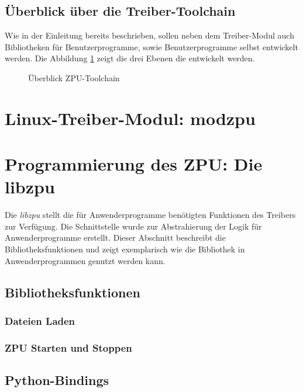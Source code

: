\documentclass[12pt]{scrartcl}
\begin{document}
\subsection{Überblick über die Treiber-Toolchain}
Wie in der Einleitung bereits beschrieben, sollen neben dem Treiber-Modul auch Bibliotheken für Benutzerprogramme, sowie Benutzerprogramme selbst entwickelt werden. Die Abbildung \ref{zpu_architecture} zeigt die drei Ebenen die entwickelt werden. 

\begin{figure}[!htb]
	\begin{center}
		
		\caption{Überblick ZPU-Toolchain}
		\label{zpu_architecture}	
	\end{center}
\end{figure}


\section{Linux-Treiber-Modul: modzpu}

\section{Programmierung des ZPU: Die libzpu}
Die \textit{libzpu} stellt die für Anwenderprogramme benötigten Funktionen des Treibers zur Verfügung. Die Schnittstelle wurde zur Abstrahierung der Logik für Anwenderprogramme erstellt. Dieser Abschnitt beschreibt die Bibliotheksfunktionen und zeigt exemplarisch wie die Bibliothek in Anwenderprogrammen genutzt werden kann.

\subsection{Bibliotheksfunktionen}

\subsubsection{Dateien Laden}

\subsubsection{ZPU Starten und Stoppen}

\subsection{Python-Bindings}
\end{document}
